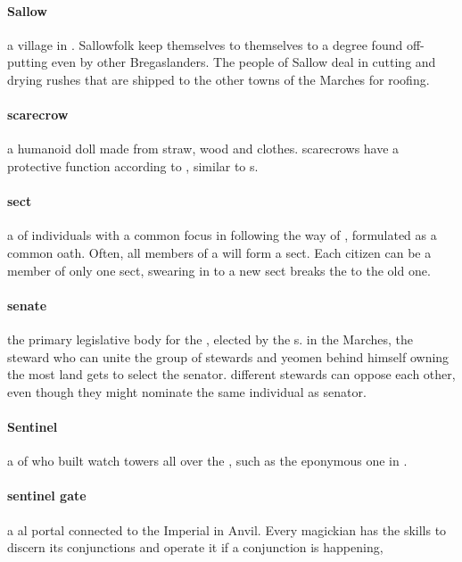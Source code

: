 \paragraph{Sallow} a village in . Sallowfolk keep themselves to themselves to a degree found off-putting even by other Bregaslanders. The people of Sallow deal in cutting and drying rushes that are shipped to the other towns of the Marches for roofing. 
\paragraph{scarecrow} a humanoid doll made from straw, wood and clothes. scarecrows have a protective function according to , similar to s.
\paragraph{sect} a  of individuals with a common focus in following the way of , formulated as a common oath. Often, all members of a  will form a sect. Each citizen can be a member of only one sect, swearing in to a new sect breaks the  to the old one. 
\paragraph{senate} the primary legislative body for the , elected by the s. in the Marches, the steward who can unite the group of stewards and yeomen behind himself owning the most land gets to select the senator. different stewards can oppose each other, even though they might nominate the same individual as senator.
\paragraph{Sentinel} a  of  who built watch towers all over the , such as the eponymous one in . 
\paragraph{sentinel gate} a al portal connected to the Imperial  in Anvil. Every magickian has the skills to discern its conjunctions and operate it if a conjunction is happening, 
